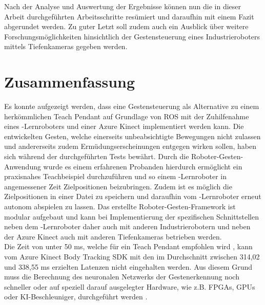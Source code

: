 Nach der Analyse und Auswertung der Ergebnisse können nun die in dieser Arbeit durchgeführten Arbeitsschritte resümiert und daraufhin mit einem Fazit abgerundet werden. Zu guter Letzt soll zudem auch ein Ausblick über weitere Forschungsmöglichkeiten hinsichtlich der Gestensteuerung eines Industrieroboters mittels Tiefenkameras gegeben werden.

\section{Zusammenfassung}
Es konnte aufgezeigt werden, dass eine Gestensteuerung als Alternative zu einem herkömmlichen Teach Pendant auf Grundlage von ROS mit der Zuhilfenahme eines -Lernroboters und einer Azure Kinect implementiert werden kann. Die entwickelten Gesten, welche einerseits unbeabsichtigte Bewegungen nicht zulassen und andererseits zudem Ermüdungserscheinungen entgegen wirken sollen, haben sich während der durchgeführten Tests bewährt. Durch die Roboter-Gesten-Anwendung wurde es einem erfahrenen Probanden hierdurch ermöglicht ein praxisnahes Teachbeispiel durchzuführen und so einem -Lernroboter in angemessener Zeit Zielpositionen beizubringen. Zudem ist es möglich die Zielpositionen in einer Datei zu speichern und daraufhin vom -Lernroboter erneut autonom abspielen zu lassen. Das erstellte Roboter-Gesten-Framework ist modular aufgebaut und kann bei Implementierung der spezifischen Schnittstellen neben dem -Lernroboter daher auch mit anderen Industrierobotern und neben der Azure Kinect auch mit anderen Tiefenkameras betrieben werden.\\

Die Zeit von unter 50 ms, welche für ein Teach Pendant empfohlen wird \cite[55]{prassler_advances_2004}, kann vom Azure Kinect Body Tracking SDK mit den im Durchschnitt zwischen 314,02 und 338,55 ms erzielten Latenzen nicht eingehalten werden. Aus diesem Grund muss die Berechnung des neuronalen Netzwerks der Gestenerkennung noch schneller oder auf speziell darauf ausgelegter Hardware, wie z.B. FPGAs, GPUs oder KI-Beschleuniger, durchgeführt werden \cite{welche_hardware_ki_nodate}.\\

